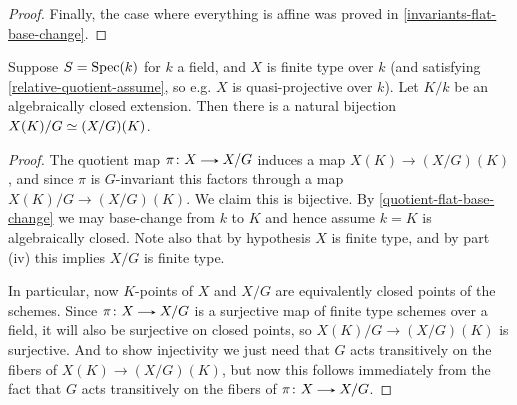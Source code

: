 \begin{nothing}
\begin{subproposition}
\begin{proof}
      Finally, the case where everything is affine was proved in \cref{invariants-flat-base-change}.
    \end{proof}
  \end{subproposition}

  \begin{subproposition}
    \label{quotient-points}
    Suppose $S = \operatorname{Spec}(k)$ for $k$ a field, and $X$ is finite type over $k$ (and satisfying \cref{relative-quotient-assume}, so e.g. $X$ is quasi-projective over $k$). Let $K/k$ be an algebraically closed extension. Then there is a natural bijection $X(K)/G \simeq (X/G)(K)$.

    \begin{proof}
      The quotient map $\pi \c X \to X/G$ induces a map $X(K) \to (X/G)(K)$, and since $\pi$ is $G$-invariant this factors through a map $X(K)/G \to (X/G)(K)$. We claim this is bijective. By \cref{quotient-flat-base-change} we may base-change from $k$ to $K$ and hence assume $k = K$ is algebraically closed. Note also that by hypothesis $X$ is finite type, and by part (iv) this implies $X/G$ is finite type.

      In particular, now $K$-points of $X$ and $X/G$ are equivalently closed points of the schemes. Since $\pi \c X \to X/G$ is a surjective map of finite type schemes over a field, it will also be surjective on closed points, so $X(K)/G \to (X/G)(K)$ is surjective. And to show injectivity we just need that $G$ acts transitively on the fibers of $X(K) \to (X/G)(K)$, but now this follows immediately from the fact that $G$ acts transitively on the fibers of $\pi \c X \to X/G$.
    \end{proof}
  \end{subproposition}
\end{nothing}



